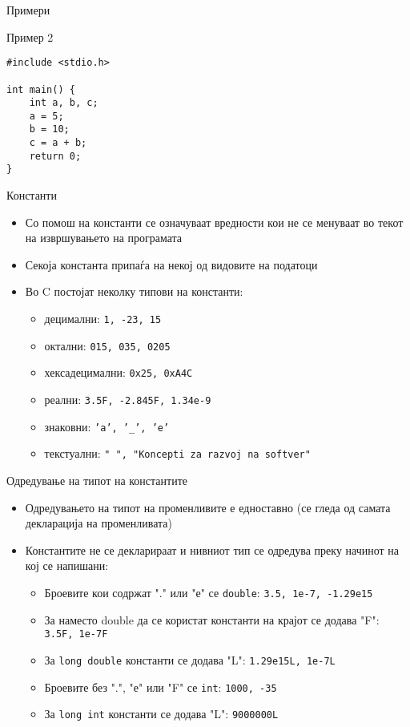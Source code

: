 \begin{frame}[fragile]{Примери}
    \begin{exampleblock}{Пример 2}
\begin{lstlisting}
#include <stdio.h>

int main() {
    int a, b, c;
    a = 5;
    b = 10;
    c = a + b;
    return 0;
}
\end{lstlisting}
    \end{exampleblock}
\end{frame}

\begin{frame}{Константи}
\begin{itemize}
\item Со помош на константи се означуваат вредности кои не се менуваат во текот на извршувањето на програмата
\item Секоја константа припаѓа на некој од видовите на податоци
\item Во C постојат неколку типови на константи:
\begin{itemize}
\item децимални: \texttt{1, -23, 15}
\item октални: \texttt{015, 035, 0205}
\item хексадецимални: \texttt{0x25, 0xA4C}
\item реални: \texttt{3.5F, -2.845F, 1.34e-9}
\item знаковни: \texttt{'a', '\_', 'e'}
\item текстуални: \texttt{" ", "Koncepti za razvoj na softver"}
\end{itemize}
\end{itemize}
\end{frame}

\begin{frame}{Одредување на типот на константите}
\begin{itemize}
\item Одредувањето на типот на променливите е едноставно (се гледа од самата декларација на променливата)
\item Константите не се декларираат и нивниот тип се одредува преку начинот на кој се напишани:
\begin{itemize}
\item Броевите кои содржат "." или "е" се {\color{blue}\texttt{double}}: \texttt{3.5, 1е-7, -1.29е15}
\item За наместо double да се користат {} константи на крајот се додава "F": \texttt{3.5F, 1e-7F}
\item За {\color{blue}\texttt{long double}} константи се додава "L": \texttt{1.29е15L, 1e-7L}
\item Броевите без ".", "е" или "F" се {\color{blue}\texttt{int}}: \texttt{1000, -35}
\item За {\color{blue}\texttt{long int}} константи се додава "L": \texttt{9000000L}
\end{itemize}
\end{itemize}
\end{frame}


